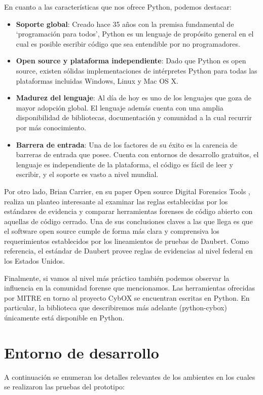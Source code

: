 En cuanto a las características que nos ofrece Python, podemos destacar:

\begin{itemize}
\item \textbf{Soporte global}: Creado hace 35 años con la premisa fundamental de \enquote*{programación para todos}, Python es un lenguaje de propósito general en el cual es posible escribir código que sea entendible por no programadores.
\item \textbf{Open source y plataforma independiente}: Dado que Python es open source, existen sólidas implementaciones de intérpretes Python para todas las plataformas incluidas Windows, Linux y Mac OS X.
\item \textbf{Madurez del lenguaje}: Al día de hoy es uno de los lenguajes que goza de mayor adopción global. El lenguaje además cuenta con una amplia disponibilidad de bibliotecas, documentación y comunidad a la cual recurrir por más conocimiento.
\item \textbf{Barrera de entrada}: Una de los factores de su éxito es la carencia de barreras de entrada que posee. Cuenta con entornos de desarrollo gratuitos, el lenguaje es independiente de la plataforma, el código es fácil de leer y escribir, y el soporte es vasto a nivel mundial.
\end{itemize}

Por otro lado, Brian Carrier, en su paper Open source Digital Forensics Tools \cite{opendftool}, realiza un planteo interesante al examinar las reglas establecidas por los estándares de evidencia y comparar herramientas forenses de código abierto con aquellas de código cerrado. Una de sus conclusiones claves a las que llega es que el software open source cumple de forma más clara y comprensiva los requerimientos establecidos por los lineamientos de pruebas de Daubert. Como referencia, el estándar de Daubert provee reglas de evidencias al nivel federal en los Estados Unidos.

Finalmente, si vamos al nivel más práctico también podemos observar la influencia en la comunidad forense que mencionamos. Las herramientas ofrecidas por MITRE en torno al proyecto CybOX se encuentran escritas en Python. En particular, la biblioteca que describiremos más adelante (python-cybox) únicamente está disponible en Python.

\section{Entorno de desarrollo}
A continuación se enumeran los detalles relevantes de los ambientes en los cuales se realizaron las pruebas del prototipo:
\newline


